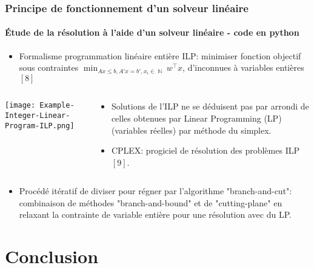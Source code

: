 \documentclass[10pt]{beamer}
\DeclareMathOperator{\NN}{\mathbb{N}}
\begin{document}
\begin{frame}
\frametitle{Principe de fonctionnement d'un solveur linéaire}
\framesubtitle{Étude de la résolution à l’aide d’un solveur linéaire - code en python}

\begin{itemize}
	\item Formalisme programmation linéaire entière ILP: minimiser fonction objectif sous contraintes $\displaystyle \min_{A x\leq b, A'x=b', x_i\in \NN} w^\top x$, d'inconnues à variables entières $[8]$
\end{itemize}
\begin{columns}[T]
\begin{column}{0.40\textwidth}
\begin{center}
\vspace{-0.5cm}
\texttt{[image: Example-Integer-Linear-Program-ILP.png]}
\end{center}
\end{column}
\begin{column}{0.60\textwidth}
\begin{itemize}
\item Solutions de l'ILP ne se déduisent pas par arrondi de celles obtenues par Linear Programming (LP) (variables réelles) par méthode du simplex.
\item CPLEX: progiciel de résolution des problèmes ILP $[9]$.
\end{itemize}
\end{column}
\end{columns}
\begin{itemize}
\item Procédé itératif de diviser pour régner par l'algorithme "branch-and-cut": combinaison de méthodes "branch-and-bound" et de "cutting-plane" en relaxant la contrainte de variable entière pour une résolution avec du LP.     
\end{itemize}


\end{frame}

\section{Conclusion}
\end{document}
